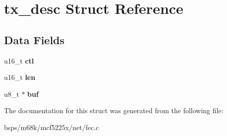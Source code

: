 \hypertarget{structtx__desc}{}\section{tx\+\_\+desc Struct Reference}
\label{structtx__desc}
\subsection*{Data Fields}
\begin{DoxyCompactItemize}
\item 
\mbox{\label{structtx__desc_a02dde831c0b93f761035fbdb7cce2f87}} 
u16\+\_\+t {\bfseries ctl}
\item 
\mbox{\label{structtx__desc_a223a304b3ce8b53abdde6520521f37d5}} 
u16\+\_\+t {\bfseries len}
\item 
\mbox{\label{structtx__desc_af71cb0f6da6919bb3154d38874e050b9}} 
u8\+\_\+t $\ast$ {\bfseries buf}
\end{DoxyCompactItemize}


The documentation for this struct was generated from the following file\+:\begin{DoxyCompactItemize}
\item 
bsps/m68k/mcf5225x/net/fec.\+c\end{DoxyCompactItemize}
